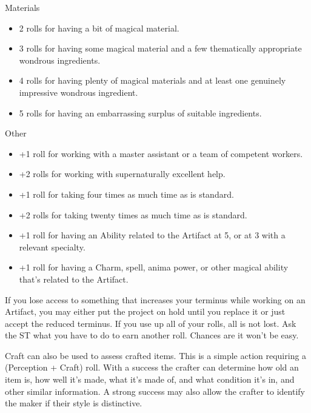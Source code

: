\documentclass[oneside]{book}
\begin{document}
\begin{multicols}{2}
  Materials
  \begin{itemize}
    \item 2 rolls for having a bit of magical material.
    \item 3 rolls for having some magical material and a few thematically appropriate wondrous ingredients.
    \item 4 rolls for having plenty of magical materials and at least one genuinely impressive wondrous ingredient.
    \item 5 rolls for having an embarrassing surplus of suitable ingredients.
  \end{itemize}

  Other
  \begin{itemize}
    \item +1 roll for working with a master assistant or a team of competent workers.
    \item +2 rolls for working with supernaturally excellent help.
    \item +1 roll for taking four times as much time as is standard.
    \item +2 rolls for taking twenty times as much time as is standard.
    \item +1 roll for having an Ability related to the Artifact at 5, or at 3 with a relevant specialty.
    \item +1 roll for having a Charm, spell, anima power, or other magical ability that's related to the Artifact.
  \end{itemize}

  \par If you lose access to something that increases your terminus while working on an Artifact, you may either put the project on hold until you replace it or just accept the reduced terminus. If you use up all of your rolls, all is not lost. Ask the ST what you have to do to earn another roll. Chances are it won't be easy.

  \par Craft can also be used to assess crafted items. This is a simple action requiring a (Perception + Craft) roll. With a success the crafter can determine how old an item is, how well it's made, what it's made of, and what condition it's in, and other similar information. A strong success may also allow the crafter to identify the maker if their style is distinctive.
\end{multicols}
\end{document}
